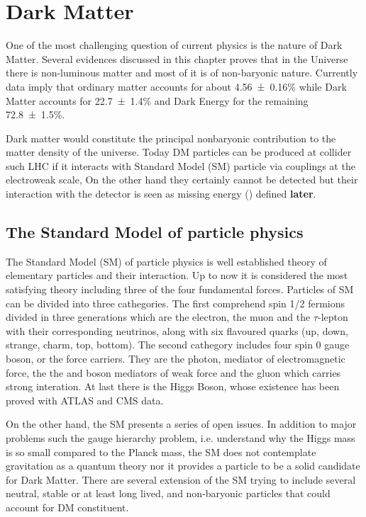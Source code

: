 \chapter{Dark Matter}
\lettrine{O}{}ne of the most challenging question of current physics is the nature of Dark Matter. Several evidences discussed in this chapter proves that in the Universe there is non-luminous matter and most of it is of non-baryonic nature. Currently data imply that ordinary matter accounts for about \num{4.56\pm0.16}\% while Dark Matter accounts for \num{22.7\pm1.4}\% and Dark Energy for the remaining \num{72.8\pm1.5}\%.

Dark matter would constitute the principal nonbaryonic contribution to the matter density of the universe. Today DM particles can be produced at collider such LHC if it interacts with Standard Model (SM) particle via couplings at the electroweak scale, On the other hand they certainly cannot be detected but their interaction with the detector is seen as missing energy (\met) defined \textbf{later}. 

\section{The Standard Model of particle physics}
The Standard Model (SM) of particle physics is well established theory of elementary particles and their interaction. Up to now it is considered the most satisfying theory including three of the four fundamental forces.
Particles of SM can be divided into three cathegories. The first comprehend spin \num{1/2} fermions divided in three generations which are the electron, the muon and the $\tau$-lepton with their corresponding neutrinos, along with six flavoured quarks (up, down, strange, charm, top, bottom). The second cathegory includes four spin 0 gauge boson, or the force carriers. They are the photon, mediator of electromagnetic force, the the \Zboson and \Wboson boson mediators of weak force and the gluon which carries strong interation. At last there is the Higgs Boson, whose existence has been proved with \RunOne ATLAS and CMS data.

On the other hand, the SM presents a series of open issues. In addition to major problems such the gauge hierarchy problem, i.e. understand why the Higgs mass is so small compared to the Planck mass, the SM does not contemplate gravitation as a quantum theory nor it provides a particle to be a solid candidate for Dark Matter. There are several extension of the SM trying to include several neutral, stable or at least long lived, and non-baryonic particles that could account for DM constituent.

